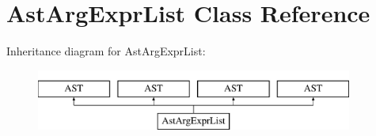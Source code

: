 \hypertarget{classAstArgExprList}{\section{Ast\-Arg\-Expr\-List Class Reference}
\label{classAstArgExprList}
}
Inheritance diagram for Ast\-Arg\-Expr\-List\-:\begin{figure}[H]
\begin{center}
\leavevmode
\includegraphics[height=2.000000cm]{classAstArgExprList}
\end{center}
\end{figure}
